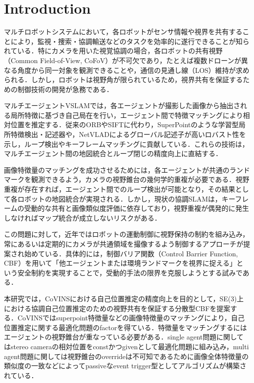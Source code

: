 \section{Introduction}

マルチロボットシステムにおいて，各ロボットがセンサ情報や視界を共有することにより，監視・捜索・協調輸送などのタスクを効率的に遂行できることが知られている．特にカメラを用いた視覚協調の場合，各ロボットの共有視野（Common Field-of-View, CoFoV）が不可欠であり，たとえば複数ドローンが異なる角度から同一対象を観測できることや，通信の見通し線（LOS）維持が求められる\cite{Panagou2017}．しかし，ロボットは視野角が限られているため，視界共有を保証するための制御技術の開発が急務である．

マルチエージェントVSLAMでは，各エージェントが撮影した画像から抽出される局所特徴に基づき自己局在を行い，エージェント間で特徴マッチングにより相対位置を推定する．従来のORBやSIFTに代わり，SuperPointのような学習型局所特徴検出・記述器\cite{DeTone2018}や，NetVLADによるグローバル記述子\cite{Arandjelovic2016}が高いロバスト性を示し，ループ検出やキーフレームマッチングに貢献している．これらの技術は，マルチエージェント間の地図統合とループ閉じの精度向上に直結する．

画像特徴量のマッチングを成功させるためには，各エージェントが共通のランドマークを観測できるよう，カメラの視野錐台の幾何学的重複が必要である．視野重複が存在すれば，エージェント間でのループ検出が可能となり，その結果として各ロボットの地図統合が実現される\cite{Zhang2022}．しかし，現状の協調SLAMは，キーフレームの受動的な共有と画像類似度評価に依存しており，視野重複が偶発的に発生しなければマップ統合が成立しないリスクがある．

この問題に対して，近年ではロボットの運動制御に視野保持の制約を組み込み，常にあるいは定期的にカメラが共通領域を撮像するよう制御するアプローチが提案され始めている．具体的には，制御バリア関数（Control Barrier Function, CBF）を用いて「他エージェントまたは環境ランドマークを視界に捉える」という安全制約を実現することで，受動的手法の限界を克服しようとする試みである\cite{Trimarchi2025}．

本研究では，CoVINSにおける自己位置推定の精度向上を目的として，SE(3)上における協調自己位置推定のための視野共有を保証する分散型CBFを提案する．CoVINSではsuperpoint特徴量などの画像特徴量のマッチングにより，自己位置推定に関する最適化問題のfactorを得ている．特徴量をマッチングするにはエージェントの視野錐台が重なっている必要がある．single agent問題に関してはstereo cameraの相対位置をconstかつgivenとして最適化問題に組み込み，multi agent問題に関しては視野錐台のoverrideは不可知であるために画像全体特徴量の類似度の一致などによってpassiveなevent trigger型としてアルゴリズムが構築されている．


